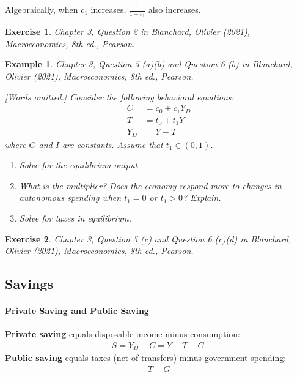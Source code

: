 \documentclass[12pt]{article}
\newtheorem{example}{Example}
\newtheorem{exercise}{Exercise}
\begin{document}
Algebraically, when $c_1$ increases, $\frac{1}{1-c_1}$ also increases.

\begin{exercise}
    Chapter 3, Question 2 in Blanchard, Olivier (2021), \textit{Macroeconomics}, 8th ed., Pearson.
\end{exercise}

\begin{example}
    Chapter 3, Question 5 (a)(b) and Question 6 (b) in Blanchard, Olivier (2021), \textit{Macroeconomics}, 8th ed., Pearson.

    [Words omitted.] Consider the following behavioral equations:
    \begin{align*}
        C &= c_0 + c_1Y_D\\
        T &= t_0 + t_1Y\\
        Y_D &= Y-T
    \end{align*}
    where $G$ and $I$ are constants. Assume that $t_1\in(0,1)$.
    \begin{enumerate}[label=\alph*.]
        \item Solve for the equilibrium output.
        \item What is the multiplier? Does the economy respond more to changes in autonomous spending when $t_1=0$ or $t_1>0$? Explain.
        \item Solve for taxes in equilibrium.
    \end{enumerate}
\end{example}

\vspace{36pt}

\begin{exercise}
    Chapter 3, Question 5 (c) and Question 6 (c)(d) in Blanchard, Olivier (2021), \textit{Macroeconomics}, 8th ed., Pearson.
\end{exercise}

\subsection*{Savings}
\paragraph{Private Saving and Public Saving}
\textbf{Private saving} equals disposable income minus consumption:
\begin{align}\label{eq:def_priv_s}
    S = Y_D - C = Y - T - C.
\end{align}
\textbf{Public saving} equals taxes (net of transfers) minus government spending:
\begin{align*}
    T - G
\end{align*}
\end{document}
